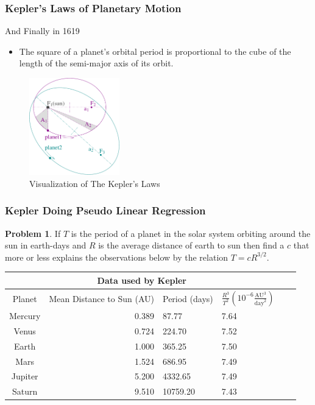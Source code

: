 \documentclass{beamer}
\theoremstyle{definition}
\newtheorem {Pro} [Thm]{Problem}
\theoremstyle{remark}
\begin{document}
  \begin{frame}
    \frametitle{Kepler's Laws of Planetary Motion}
    And Finally in 1619
    \pause
    \begin{itemize}[<+->]
      \item The square of a planet's orbital period is proportional to the cube of the length of the semi-major axis of its orbit.
    \end{itemize}
      \begin{figure}
        \centering
        \includegraphics[width=0.35\textwidth]{./data/image/kepler_laws_diagram.pdf}
      \caption{Visualization of The Kepler's Laws}
      \label{image:kepler_law_planetary}
      \end{figure}
    \end{frame}

  \begin{frame}
    \frametitle{Kepler Doing Pseudo Linear Regression}
    \begin{Pro}
    If $T$ is the period of a planet in the solar system orbiting around the sun in earth-days and 
    $R$ is the average distance of earth to sun then find a $c$ that more or less explains 
    the observations below by the relation $T=cR^{3/2}$.
      
    \end{Pro}
    \begin{tabular}{|c|r|p{1.3cm}|p{2cm}|p{2cm}|p{2cm}|}
      \hline
      \multicolumn{4}{|c|}{Data used by Kepler} \\
      \hline
      Planet & Mean Distance to Sun (AU) & Period (days) &$\frac{R^3}{T^2}(10^{-6}\frac{\text{AU}^3}{\text{day}^2})$\\
      \hline
      Mercury   & 0.389   & 87.77    & 7.64 \\
      Venus     &   0.724 & 224.70   & 7.52 \\
      Earth     & 1.000   & 365.25   & 7.50 \\
      Mars      & 1.524   & 686.95   & 7.49 \\
      Jupiter   &   5.200 & 4332.65  & 7.49 \\
      Saturn    & 9.510   & 10759.20 & 7.43 \\
      \hline
     \end{tabular}\label{tab:kepler_tycho_data}
    \end{frame}
\end{document}
